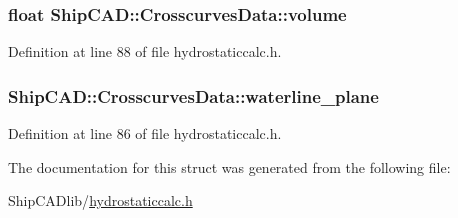 \hypertarget{structShipCAD_1_1CrosscurvesData_a9bec38a77bf87ab5feb76899e39e4f7b}{
\subsubsection[{volume}]{\setlength{\rightskip}{0pt plus 5cm}float Ship\-C\-A\-D\-::\-Crosscurves\-Data\-::volume}}\label{structShipCAD_1_1CrosscurvesData_a9bec38a77bf87ab5feb76899e39e4f7b}


Definition at line 88 of file hydrostaticcalc.\-h.

\hypertarget{structShipCAD_1_1CrosscurvesData_a1ea6de1b52289e8392e8d499ae4aad04}{
\subsubsection[{waterline\-\_\-plane}]{ Ship\-C\-A\-D\-::\-Crosscurves\-Data\-::waterline\-\_\-plane}}\label{structShipCAD_1_1CrosscurvesData_a1ea6de1b52289e8392e8d499ae4aad04}


Definition at line 86 of file hydrostaticcalc.\-h.



The documentation for this struct was generated from the following file\-:\begin{DoxyCompactItemize}
\item 
Ship\-C\-A\-Dlib/\hyperlink{hydrostaticcalc_8h}{hydrostaticcalc.\-h}\end{DoxyCompactItemize}
